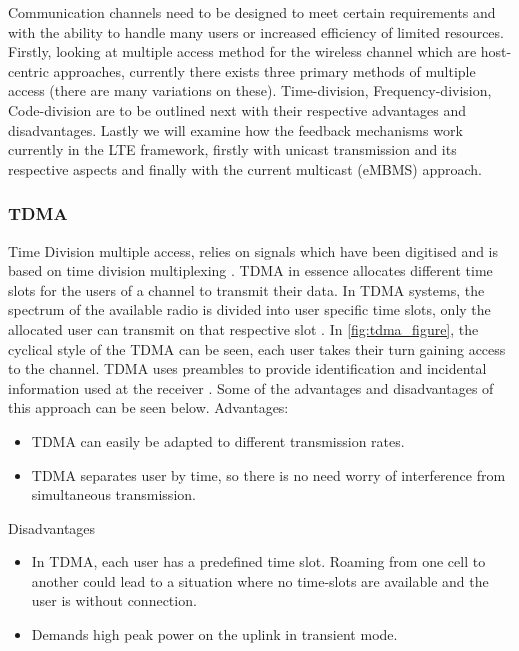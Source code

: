 \documentclass{article}
\begin{document}
Communication channels need to be designed to meet certain requirements and with the ability to handle many users or increased efficiency of limited resources. Firstly, looking at multiple access method for the wireless channel which are host-centric approaches, currently there exists three primary methods of multiple access (there are many variations on these). Time-division, Frequency-division, Code-division are to be outlined next with their respective advantages and disadvantages. Lastly we will examine how the feedback mechanisms work currently in the LTE framework, firstly with unicast transmission and its respective aspects and finally with the current multicast (eMBMS) approach. \newline

\subsubsection{TDMA} 
Time Division multiple access,  relies on signals which have been digitised and is based on time division multiplexing \cite{tdma_info}. TDMA in essence allocates different time slots for the users of a channel to transmit their data. In TDMA systems, the spectrum of the available radio is divided into user specific time slots, only the allocated user can transmit on that respective slot \cite{tdma_info}. In \cref{fig:tdma_figure}, the cyclical style of the TDMA can be seen, each user takes their turn gaining access to the channel. TDMA uses preambles to provide identification and incidental information used at the receiver \cite{tdma_info}.
Some of the advantages and disadvantages of this approach can be seen below.\newline
Advantages:\
\begin{itemize}
    \item TDMA can easily be adapted to different transmission rates.
    \item TDMA separates user by time, so there is no need worry of interference from simultaneous transmission.
\end{itemize}
Disadvantages\newline
\begin{itemize}
    \item In TDMA, each user has a predefined time slot. Roaming from one cell to another could lead to a situation where no time-slots are available and the user is without connection.
    \item Demands high peak power on the uplink in transient mode.
\end{itemize}
\end{document}
